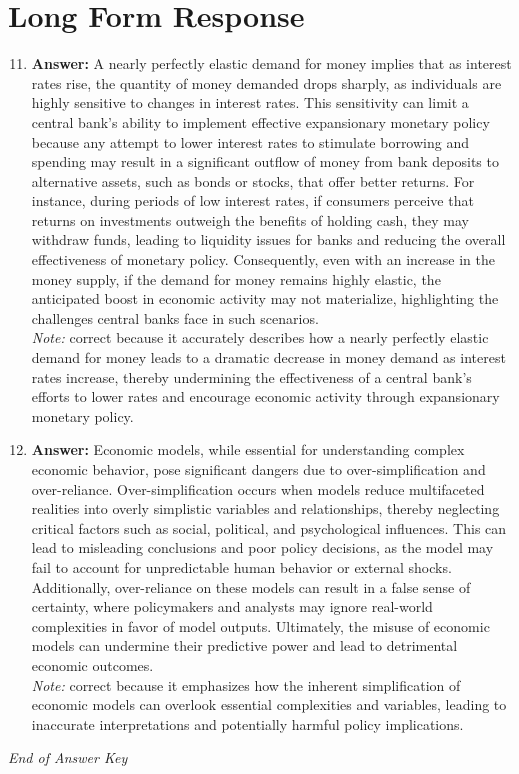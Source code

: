 \documentclass[12pt]{article}
\begin{document}
\section*{Long Form Response}
\begin{enumerate}[label=\arabic*.]
\setcounter{enumi}{10}
\item \textbf{Answer:} A nearly perfectly elastic demand for money implies that as interest rates rise, the quantity of money demanded drops sharply, as individuals are highly sensitive to changes in interest rates. This sensitivity can limit a central bank's ability to implement effective expansionary monetary policy because any attempt to lower interest rates to stimulate borrowing and spending may result in a significant outflow of money from bank deposits to alternative assets, such as bonds or stocks, that offer better returns. For instance, during periods of low interest rates, if consumers perceive that returns on investments outweigh the benefits of holding cash, they may withdraw funds, leading to liquidity issues for banks and reducing the overall effectiveness of monetary policy. Consequently, even with an increase in the money supply, if the demand for money remains highly elastic, the anticipated boost in economic activity may not materialize, highlighting the challenges central banks face in such scenarios.
\\ \textit{Note:} correct because it accurately describes how a nearly perfectly elastic demand for money leads to a dramatic decrease in money demand as interest rates increase, thereby undermining the effectiveness of a central bank's efforts to lower rates and encourage economic activity through expansionary monetary policy.
\item \textbf{Answer:} Economic models, while essential for understanding complex economic behavior, pose significant dangers due to over-simplification and over-reliance. Over-simplification occurs when models reduce multifaceted realities into overly simplistic variables and relationships, thereby neglecting critical factors such as social, political, and psychological influences. This can lead to misleading conclusions and poor policy decisions, as the model may fail to account for unpredictable human behavior or external shocks. Additionally, over-reliance on these models can result in a false sense of certainty, where policymakers and analysts may ignore real-world complexities in favor of model outputs. Ultimately, the misuse of economic models can undermine their predictive power and lead to detrimental economic outcomes.
\\ \textit{Note:} correct because it emphasizes how the inherent simplification of economic models can overlook essential complexities and variables, leading to inaccurate interpretations and potentially harmful policy implications.
\end{enumerate}

\vfill
\noindent\textit{End of Answer Key}
\end{document}
